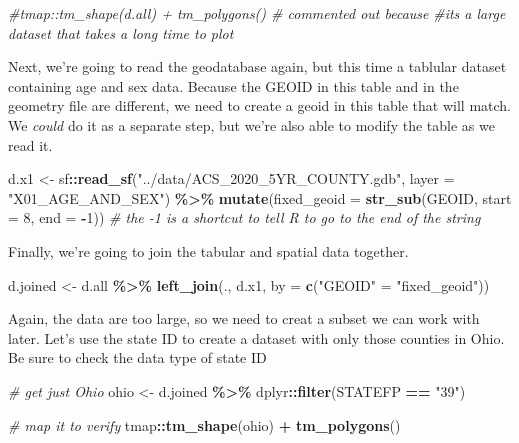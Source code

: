 \documentclass[]{article}
\newenvironment{Shaded}{\begin{snugshade}}{\end{snugshade}}
\newcommand{\AttributeTok}[1]{\textcolor[rgb]{0.13,0.29,0.53}{#1}}
\newcommand{\CommentTok}[1]{\textcolor[rgb]{0.56,0.35,0.01}{\textit{#1}}}
\newcommand{\DecValTok}[1]{\textcolor[rgb]{0.00,0.00,0.81}{#1}}
\newcommand{\FunctionTok}[1]{\textcolor[rgb]{0.13,0.29,0.53}{\textbf{#1}}}
\newcommand{\NormalTok}[1]{#1}
\newcommand{\OtherTok}[1]{\textcolor[rgb]{0.56,0.35,0.01}{#1}}
\newcommand{\SpecialCharTok}[1]{\textcolor[rgb]{0.81,0.36,0.00}{\textbf{#1}}}
\newcommand{\StringTok}[1]{\textcolor[rgb]{0.31,0.60,0.02}{#1}}
\begin{document}
\begin{Shaded}
\begin{Highlighting}[]
\CommentTok{\#tmap::tm\_shape(d.all) + tm\_polygons() \# commented out because }
\CommentTok{\#it\textquotesingle{}s a large dataset that takes a long time to plot}
\end{Highlighting}
\end{Shaded}

Next, we're going to read the geodatabase again, but this time a
tablular dataset containing age and sex data. Because the GEOID in this
table and in the geometry file are different, we need to create a geoid
in this table that will match. We \emph{could} do it as a separate step,
but we're also able to modify the table as we read it.

\begin{Shaded}
\begin{Highlighting}[]
\NormalTok{d.x1 }\OtherTok{\textless{}{-}}\NormalTok{ sf}\SpecialCharTok{::}\FunctionTok{read\_sf}\NormalTok{(}\StringTok{"../data/ACS\_2020\_5YR\_COUNTY.gdb"}\NormalTok{, }\AttributeTok{layer =} \StringTok{"X01\_AGE\_AND\_SEX"}\NormalTok{) }\SpecialCharTok{\%\textgreater{}\%}
  \FunctionTok{mutate}\NormalTok{(}\AttributeTok{fixed\_geoid =} \FunctionTok{str\_sub}\NormalTok{(GEOID, }\AttributeTok{start =} \DecValTok{8}\NormalTok{, }\AttributeTok{end =} \SpecialCharTok{{-}}\DecValTok{1}\NormalTok{)) }
\CommentTok{\# the {-}1 is a shortcut to tell R to go to the end of the string}
\end{Highlighting}
\end{Shaded}

Finally, we're going to join the tabular and spatial data together.

\begin{Shaded}
\begin{Highlighting}[]
\NormalTok{d.joined }\OtherTok{\textless{}{-}}\NormalTok{ d.all }\SpecialCharTok{\%\textgreater{}\%} \FunctionTok{left\_join}\NormalTok{(., d.x1, }\AttributeTok{by =} \FunctionTok{c}\NormalTok{(}\StringTok{"GEOID"} \OtherTok{=} \StringTok{"fixed\_geoid"}\NormalTok{))}
\end{Highlighting}
\end{Shaded}

Again, the data are too large, so we need to creat a subset we can work
with later. Let's use the state ID to create a dataset with only those
counties in Ohio. Be sure to check the data type of state ID

\begin{Shaded}
\begin{Highlighting}[]
\CommentTok{\# get just Ohio}
\NormalTok{ohio }\OtherTok{\textless{}{-}}\NormalTok{ d.joined }\SpecialCharTok{\%\textgreater{}\%}\NormalTok{ dplyr}\SpecialCharTok{::}\FunctionTok{filter}\NormalTok{(STATEFP }\SpecialCharTok{==} \StringTok{"39"}\NormalTok{)}


\CommentTok{\# map it to verify}
\NormalTok{tmap}\SpecialCharTok{::}\FunctionTok{tm\_shape}\NormalTok{(ohio) }\SpecialCharTok{+} \FunctionTok{tm\_polygons}\NormalTok{()}
\end{Highlighting}
\end{Shaded}
\end{document}
